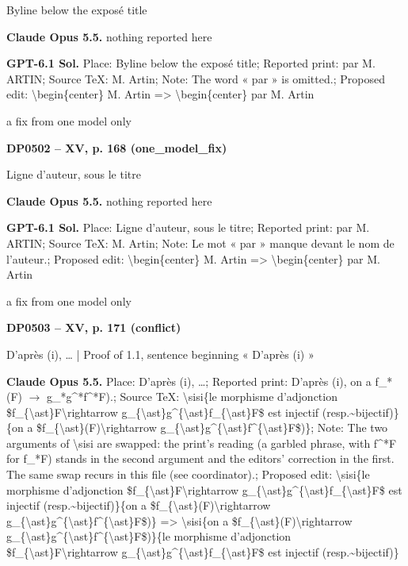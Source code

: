 Byline below the exposé title\par
\textbf{Claude Opus 5.5.} nothing reported here\par
\textbf{GPT-6.1 Sol.} Place: Byline below the exposé title; Reported print: par M. ARTIN; Source TeX: M. Artin; Note: The word « par » is omitted.; Proposed edit: \textbackslash{}begin\{center\} M. Artin =\allowbreak > \textbackslash{}begin\{center\} par M. Artin\par
a fix from one model only\par
\par\noindent\hypertarget{DP0502}{}\textbf{DP0502 -- XV, p. 168 (one\_model\_fix)}\par
Ligne d’auteur, sous le titre\par
\textbf{Claude Opus 5.5.} nothing reported here\par
\textbf{GPT-6.1 Sol.} Place: Ligne d’auteur, sous le titre; Reported print: par M. ARTIN; Source TeX: M. Artin; Note: Le mot « par » manque devant le nom de l’auteur.; Proposed edit: \textbackslash{}begin\{center\} M. Artin =\allowbreak > \textbackslash{}begin\{center\} par M. Artin\par
a fix from one model only\par
\par\noindent\hypertarget{DP0503}{}\textbf{DP0503 -- XV, p. 171 (conflict)}\par
D'après (i), … | Proof of 1.1, sentence beginning « D'après (i) »\par
\textbf{Claude Opus 5.5.} Place: D'après (i), …; Reported print: D'après (i), on a f\_*(F) \ensuremath{\to} g\_*g\textasciicircum{}*f\textasciicircum{}*F).; Source TeX: \textbackslash{}sisi\{le morphisme d'adjonction \$f\_\{\textbackslash{}ast\}F\textbackslash{}rightarrow g\_\{\textbackslash{}ast\}g\textasciicircum{}\{\textbackslash{}ast\}f\_\{\textbackslash{}ast\}F\$ est injectif (resp.\textasciitilde{}bijectif)\}\{on a \$f\_\{\textbackslash{}ast\}(F)\textbackslash{}rightarrow g\_\{\textbackslash{}ast\}g\textasciicircum{}\{\textbackslash{}ast\}f\textasciicircum{}\{\textbackslash{}ast\}F\$)\}; Note: The two arguments of \textbackslash{}sisi are swapped: the print's reading (a garbled phrase, with f\textasciicircum{}*F for f\_*F) stands in the second argument and the editors' correction in the first. The same swap recurs in this file (see coordinator).; Proposed edit: \textbackslash{}sisi\{le morphisme d'adjonction \$f\_\{\textbackslash{}ast\}F\textbackslash{}rightarrow g\_\{\textbackslash{}ast\}g\textasciicircum{}\{\textbackslash{}ast\}f\_\{\textbackslash{}ast\}F\$ est injectif (resp.\textasciitilde{}bijectif)\}\{on a \$f\_\{\textbackslash{}ast\}(F)\textbackslash{}rightarrow g\_\{\textbackslash{}ast\}g\textasciicircum{}\{\textbackslash{}ast\}f\textasciicircum{}\{\textbackslash{}ast\}F\$)\} =\allowbreak > \textbackslash{}sisi\{on a \$f\_\{\textbackslash{}ast\}(F)\textbackslash{}rightarrow g\_\{\textbackslash{}ast\}g\textasciicircum{}\{\textbackslash{}ast\}f\textasciicircum{}\{\textbackslash{}ast\}F\$)\}\{le morphisme d'adjonction \$f\_\{\textbackslash{}ast\}F\textbackslash{}rightarrow g\_\{\textbackslash{}ast\}g\textasciicircum{}\{\textbackslash{}ast\}f\_\{\textbackslash{}ast\}F\$ est injectif (resp.\textasciitilde{}bijectif)\}\par

